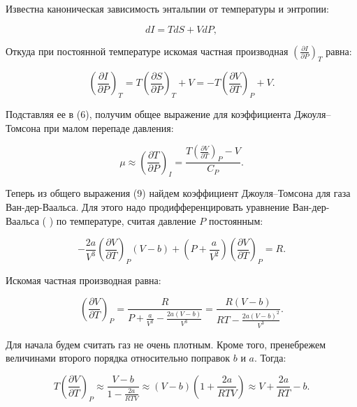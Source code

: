 \documentclass[a4paper,12pt]{article}
\begin{document}
Известна каноническая зависимость энтальпии от температуры и энтропии:

\begin{equation}
dI = T dS + V dP,
\end{equation}

Откуда при постоянной температуре искомая частная производная $\left( \frac{\partial I}{\partial P} \right)_T$ равна:

\begin{equation}
\left( \frac{\partial I}{\partial P} \right)_T = T \left( \frac{\partial S}{\partial P} \right)_T + V = -T \left( \frac{\partial V}{\partial T} \right)_P + V.
\end{equation}

Подставляя ее в (6), получим общее выражение для коэффициента Джоуля–Томсона при малом перепаде давления:

\begin{equation}
\mu \approx \left( \frac{\partial T}{\partial P} \right)_I = \frac{T \left( \frac{\partial V}{\partial T} \right)_P - V}{C_P}.
\end{equation}

Теперь из общего выражения (9) найдем коэффициент Джоуля–Томсона для газа Ван-дер-Ваальса. Для этого надо продифференцировать уравнение Ван-дер-Ваальса (  ) по температуре, считая давление $P$ постоянным:

\begin{equation}
-\frac{2a}{V^3} \left( \frac{\partial V}{\partial T} \right)_P (V - b) + \left( P + \frac{a}{V^2} \right) \left( \frac{\partial V}{\partial T} \right)_P = R.
\end{equation}

Искомая частная производная равна:

\begin{equation}
\left( \frac{\partial V}{\partial T} \right)_P = \frac{R}{P + \frac{a}{V^2} - \frac{2a(V - b)}{V^3}} = \frac{R(V - b)}{RT - \frac{2a(V - b)^2}{V^3}}.
\end{equation}

Для начала будем считать газ не очень плотным. Кроме того, пренебрежем величинами второго порядка относительно поправок $b$ и $a$. Тогда:

\begin{equation}
T \left( \frac{\partial V}{\partial T} \right)_P \approx \frac{V - b}{1 - \frac{2a}{RTV}} \approx (V - b) \left( 1 + \frac{2a}{RTV} \right) \approx V + \frac{2a}{RT} - b.
\end{equation}
\end{document}
